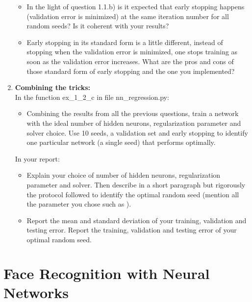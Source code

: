 \documentclass[a4paper]{article}
\begin{document}
\begin{enumerate}[label=(\alph*)]
\begin{itemize}
        \item In the light of question 1.1.b) is it expected that early stopping happens (validation error is minimized) at the same iteration number for all random seeds? Is it coherent with your results?
        \item Early stopping in its standard form is a little different, instead of stopping when the validation error is minimized, one stops training as soon as the validation error increases. What are the pros and cons of those standard form of early stopping and the one you implemented?
    \end{itemize}

	\item \textbf{Combining the tricks:}\\
     In the function ex\_1\_2\_c in file nn\_regression.py:
    \begin{itemize}
        \item Combining the results from all the previous questions, train a network with the ideal number of hidden neurons, regularization parameter and solver choice. Use 10 seeds, a validation set and early stopping to identify one particular network (a single seed) that performs optimally.
    \end{itemize}
    In your report:
    \begin{itemize}
        \item Explain your choice of number of hidden neurons, regularization parameter and solver. Then describe in a short paragraph but rigorously the protocol followed to identify the optimal random seed (mention all the parameter you chose such as ).
        \item Report the mean and standard deviation of your training, validation and testing error. Report the training, validation and testing error of your optimal random seed.
    \end{itemize}
\end{enumerate}

\newpage

\section{Face Recognition with Neural Networks}
\end{document}

